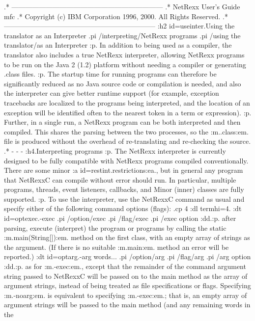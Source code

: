 .* ------------------------------------------------------------------
.* NetRexx User's Guide                                              mfc
.* Copyright (c) IBM Corporation 1996, 2000.  All Rights Reserved.
.* ------------------------------------------------------------------
:h2 id=useinter.Using the translator as an Interpreter
.pi /interpreting/NetRexx programs
.pi /using the translator/as an Interpreter
:p.
In addition to being used as a compiler, the translator also includes a
true NetRexx interpreter, allowing NetRexx programs to be run on the
Java 2 (1.2) platform without needing a compiler or generating .class
files.
:p.
The startup time for running programs can therefore be significantly
reduced as no Java source code or compilation is needed, and also the
interpreter can give better runtime support (for example, exception
tracebacks are localized to the programs being interpreted, and the
location of an exception will be identified often to the nearest token
in a term or expression).
:p.
Further, in a single run, a NetRexx program can be both interpreted and
then compiled.  This shares the parsing between the two processes, so
the :m..class:em. file is produced without the overhead of
re-translating and re-checking the source.
.* - - -
:h4.Interpreting programs
:p.
The NetRexx interpreter is currently designed to be fully compatible
with NetRexx programs compiled conventionally.  There are some minor
:a id=restint.restrictions:ea., but in general any program that NetRexxC
can compile without error should run.  In particular, multiple programs,
threads, event listeners, callbacks, and Minor (inner) classes are fully
supported.
:p.
To use the interpreter, use the NetRexxC command as usual and specify
either of the following command options (flags):
.cp 4
:dl termhi=4.
:dt id=optexec.-exec
.pi /option/exec
.pi /flag/exec
.pi /exec option
:dd.:p.
after parsing, execute (interpret) the program or programs by calling
the static :m.main(String[]):em. method on the first class, with an
empty array of strings as the argument.  (If there is no suitable :m.main:em.
method an error will be reported.)
:dt id=optarg.-arg words...
.pi /option/arg
.pi /flag/arg
.pi /arg option
:dd.:p.
as for :m.-exec:em., except that the remainder of the command argument
string passed to NetRexxC will be passed on to the main method as the
array of argument strings, instead of being treated as file
specifications or flags.  Specifying :m.-noarg:em. is equivalent to
specifying :m.-exec:em.; that is, an empty array of argument strings
will be passed to the main method (and any remaining words in the
